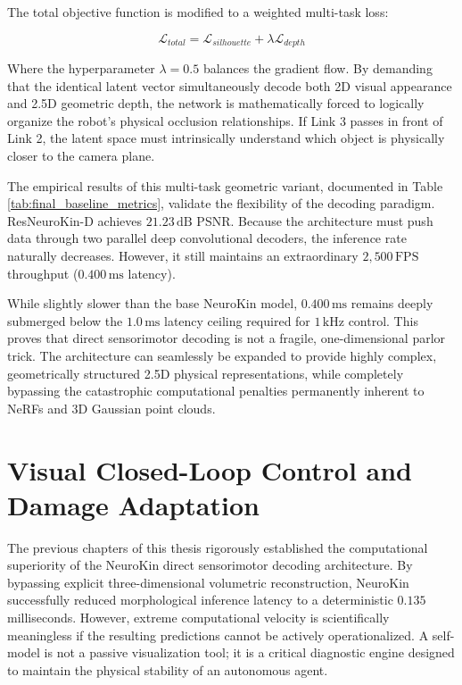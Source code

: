 \documentclass[12pt,a4paper,oneside]{report}
\begin{document}
The total objective function is modified to a weighted multi-task loss:

\begin{equation}
\mathcal{L}_{total} = \mathcal{L}_{silhouette} + \lambda \mathcal{L}_{depth}
\end{equation}

Where the hyperparameter $\lambda = 0.5$ balances the gradient flow. By demanding that the identical latent vector simultaneously decode both 2D visual appearance and 2.5D geometric depth, the network is mathematically forced to logically organize the robot's physical occlusion relationships. If Link 3 passes in front of Link 2, the latent space must intrinsically understand which object is physically closer to the camera plane.

The empirical results of this multi-task geometric variant, documented in Table \ref{tab:final_baseline_metrics}, validate the flexibility of the decoding paradigm. ResNeuroKin-D achieves $21.23\,\mathrm{dB}$ PSNR. Because the architecture must push data through two parallel deep convolutional decoders, the inference rate naturally decreases. However, it still maintains an extraordinary $2{,}500\,\mathrm{FPS}$ throughput ($0.400\,\mathrm{ms}$ latency). 

While slightly slower than the base NeuroKin model, $0.400\,\mathrm{ms}$ remains deeply submerged below the $1.0\,\mathrm{ms}$ latency ceiling required for $1\,\mathrm{kHz}$ control. This proves that direct sensorimotor decoding is not a fragile, one-dimensional parlor trick. The architecture can seamlessly be expanded to provide highly complex, geometrically structured 2.5D physical representations, while completely bypassing the catastrophic computational penalties permanently inherent to NeRFs and 3D Gaussian point clouds.

\chapter{Visual Closed-Loop Control and Damage Adaptation}

The previous chapters of this thesis rigorously established the computational superiority of the NeuroKin direct sensorimotor decoding architecture. By bypassing explicit three-dimensional volumetric reconstruction, NeuroKin successfully reduced morphological inference latency to a deterministic $0.135$ milliseconds. However, extreme computational velocity is scientifically meaningless if the resulting predictions cannot be actively operationalized. A self-model is not a passive visualization tool; it is a critical diagnostic engine designed to maintain the physical stability of an autonomous agent.
\end{document}
